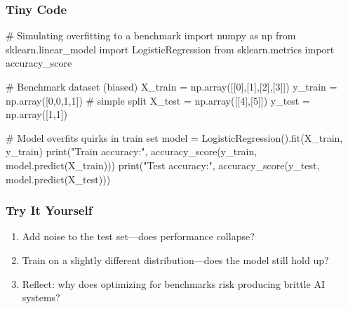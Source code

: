 \documentclass[
  letterpaper,
  DIV=11,
  numbers=noendperiod]{scrreprt}
\newenvironment{Shaded}{\begin{snugshade}}{\end{snugshade}}
\newcommand{\BuiltInTok}[1]{\textcolor[rgb]{0.00,0.23,0.31}{#1}}
\newcommand{\CommentTok}[1]{\textcolor[rgb]{0.37,0.37,0.37}{#1}}
\newcommand{\DecValTok}[1]{\textcolor[rgb]{0.68,0.00,0.00}{#1}}
\newcommand{\ImportTok}[1]{\textcolor[rgb]{0.00,0.46,0.62}{#1}}
\newcommand{\NormalTok}[1]{\textcolor[rgb]{0.00,0.23,0.31}{#1}}
\newcommand{\OperatorTok}[1]{\textcolor[rgb]{0.37,0.37,0.37}{#1}}
\newcommand{\StringTok}[1]{\textcolor[rgb]{0.13,0.47,0.30}{#1}}
\providecommand{\tightlist}{%
  \setlength{\itemsep}{0pt}\setlength{\parskip}{0pt}}
\begin{document}
\subsubsection{Tiny Code}\label{tiny-code-86}

\begin{Shaded}
\begin{Highlighting}[]
\CommentTok{\# Simulating overfitting to a benchmark}
\ImportTok{import}\NormalTok{ numpy }\ImportTok{as}\NormalTok{ np}
\ImportTok{from}\NormalTok{ sklearn.linear\_model }\ImportTok{import}\NormalTok{ LogisticRegression}
\ImportTok{from}\NormalTok{ sklearn.metrics }\ImportTok{import}\NormalTok{ accuracy\_score}

\CommentTok{\# Benchmark dataset (biased)}
\NormalTok{X\_train }\OperatorTok{=}\NormalTok{ np.array([[}\DecValTok{0}\NormalTok{],[}\DecValTok{1}\NormalTok{],[}\DecValTok{2}\NormalTok{],[}\DecValTok{3}\NormalTok{]])}
\NormalTok{y\_train }\OperatorTok{=}\NormalTok{ np.array([}\DecValTok{0}\NormalTok{,}\DecValTok{0}\NormalTok{,}\DecValTok{1}\NormalTok{,}\DecValTok{1}\NormalTok{])  }\CommentTok{\# simple split}
\NormalTok{X\_test  }\OperatorTok{=}\NormalTok{ np.array([[}\DecValTok{4}\NormalTok{],[}\DecValTok{5}\NormalTok{]])}
\NormalTok{y\_test  }\OperatorTok{=}\NormalTok{ np.array([}\DecValTok{1}\NormalTok{,}\DecValTok{1}\NormalTok{])}

\CommentTok{\# Model overfits quirks in train set}
\NormalTok{model }\OperatorTok{=}\NormalTok{ LogisticRegression().fit(X\_train, y\_train)}
\BuiltInTok{print}\NormalTok{(}\StringTok{"Train accuracy:"}\NormalTok{, accuracy\_score(y\_train, model.predict(X\_train)))}
\BuiltInTok{print}\NormalTok{(}\StringTok{"Test accuracy:"}\NormalTok{, accuracy\_score(y\_test, model.predict(X\_test)))}
\end{Highlighting}
\end{Shaded}

\subsubsection{Try It Yourself}\label{try-it-yourself-86}

\begin{enumerate}
\def\labelenumi{\arabic{enumi}.}
\tightlist
\item
  Add noise to the test set---does performance collapse?
\item
  Train on a slightly different distribution---does the model still hold
  up?
\item
  Reflect: why does optimizing for benchmarks risk producing brittle AI
  systems?
\end{enumerate}
\end{document}
